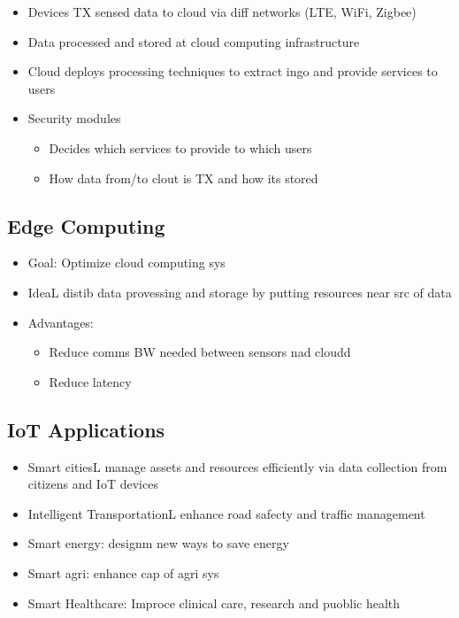 \begin{itemize}
	\item Devices TX sensed data to cloud via diff networks (LTE, WiFi,
		Zigbee)
	\item Data processed and stored at cloud computing infrastructure
	\item Cloud deploys processing techniques to extract ingo and provide
		services to users
	\item Security modules
	\begin{itemize}
		\item Decides which services to provide to which users
		\item How data from/to clout is TX and how its stored
	\end{itemize}
\end{itemize}

\subsection{Edge Computing}

\begin{itemize}
	\item Goal: Optimize cloud computing sys
	\item IdeaL distib data provessing and storage by putting resources near
		src of data
	\item Advantages:
	\begin{itemize}
		\item Reduce comms BW needed between sensors nad cloudd
		\item Reduce latency
	\end{itemize}
\end{itemize}

\subsection{IoT Applications}

\begin{itemize}
	\item Smart citiesL manage assets and resources efficiently via data
		collection from citizens and IoT devices
	\item Intelligent TransportationL enhance road safecty and traffic
		management
	\item Smart energy: designm new ways to save energy
	\item Smart agri: enhance cap of agri sys
	\item Smart Healthcare: Improce clinical care, research and puoblic
		health
\end{itemize}

